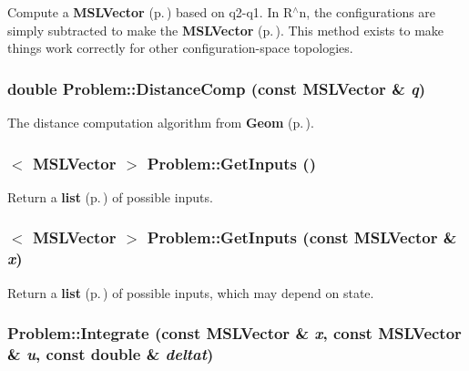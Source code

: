 Compute a {\bf MSLVector} {\rm (p.\,\pageref{classMSLVector})} based on q2-q1. In R$^\wedge$n, the configurations are simply subtracted to make the {\bf MSLVector} {\rm (p.\,\pageref{classMSLVector})}. This method exists to make things work correctly for other configuration-space topologies.

\subsubsection{\setlength{\rightskip}{0pt plus 5cm}double Problem::Distance\-Comp (const {\bf MSLVector} \& {\em q})\hspace{0.3cm}{\tt  [virtual]}}\label{classProblem_a13}


The distance computation algorithm from {\bf Geom} {\rm (p.\,\pageref{classGeom})}.

\subsubsection{$<$ {\bf MSLVector} $>$ Problem::Get\-Inputs ()\hspace{0.3cm}{\tt  [virtual]}}\label{classProblem_a5}


Return a {\bf list} {\rm (p.\,\pageref{classlist})} of possible inputs.

\subsubsection{$<$ {\bf MSLVector} $>$ Problem::Get\-Inputs (const {\bf MSLVector} \& {\em x})\hspace{0.3cm}{\tt  [virtual]}}\label{classProblem_a4}


Return a {\bf list} {\rm (p.\,\pageref{classlist})} of possible inputs, which may depend on state.

\subsubsection{ Problem::Integrate (const {\bf MSLVector} \& {\em x}, const {\bf MSLVector} \& {\em u}, const double \& {\em deltat})\hspace{0.3cm}{\tt  [virtual]}}\label{classProblem_a6}


